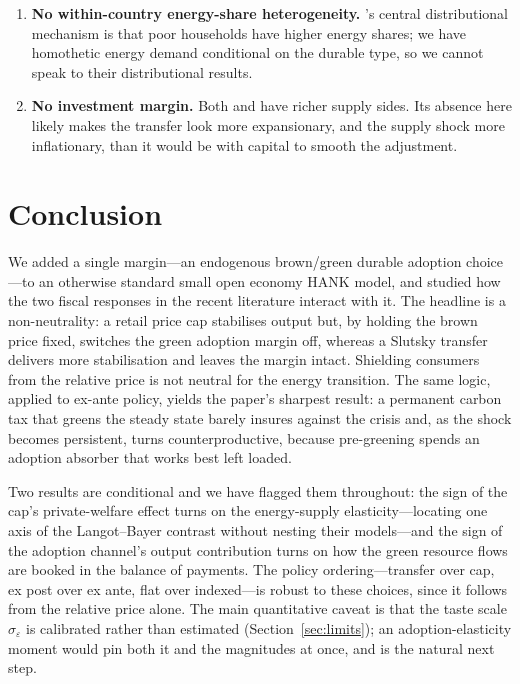 \documentclass[11pt,a4paper]{article}
\begin{document}
\begin{enumerate}
\item \textbf{No within-country energy-share heterogeneity.}
\citet{Bayer2026}'s central distributional mechanism is that poor households
have higher energy shares; we have homothetic energy demand conditional on
the durable type, so we cannot speak to their distributional results.

\item \textbf{No investment margin.} Both \citet{Bayer2026} and
\citet{ARS2024} have richer supply sides. Its absence here likely makes the
transfer look more expansionary, and the supply shock more inflationary, than
it would be with capital to smooth the adjustment.

\end{enumerate}

\section{Conclusion}
\label{sec:conclusion}

We added a single margin---an endogenous brown/green durable adoption choice---to
an otherwise standard small open economy HANK model, and studied how the two
fiscal responses in the recent literature interact with it. The headline is a
non-neutrality: a retail price cap stabilises output but, by holding the brown
price fixed, switches the green adoption margin off, whereas a Slutsky transfer
delivers more stabilisation and leaves the margin intact. Shielding consumers from
the relative price is not neutral for the energy transition. The same logic,
applied to ex-ante policy, yields the paper's sharpest result: a permanent carbon
tax that greens the steady state barely insures against the crisis and, as the
shock becomes persistent, turns counterproductive, because pre-greening spends an
adoption absorber that works best left loaded.

Two results are conditional and we have flagged them throughout: the sign of the
cap's private-welfare effect turns on the energy-supply elasticity---locating one
axis of the Langot--Bayer contrast without nesting their models---and the sign of
the adoption channel's output contribution turns on how the green resource flows
are booked in the balance of payments. The policy ordering---transfer over cap,
ex post over ex ante, flat over indexed---is robust to these choices, since it
follows from the relative price alone. The main quantitative caveat is that the
taste scale $\sigma_\varepsilon$ is calibrated rather than estimated
(Section~\ref{sec:limits}); an adoption-elasticity moment would pin both it and
the magnitudes at once, and is the natural next step.
\end{document}
